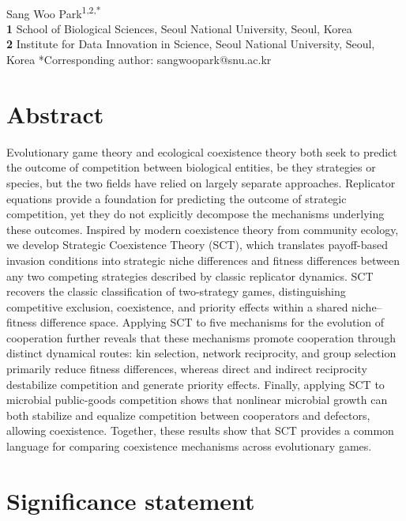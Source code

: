 \documentclass[12pt]{article}
\date{\today}
\begin{document}
\begin{flushleft}{
	\Large
	\textbf{}
}
\newline
\\
Sang Woo Park\textsuperscript{1,2,*}
\\
\bigskip
\textbf{1} School of Biological Sciences, Seoul National University, Seoul, Korea\\
\textbf{2} Institute for Data Innovation in Science, Seoul National University, Seoul, Korea
*Corresponding author: sangwoopark@snu.ac.kr
\end{flushleft}

\section*{Abstract}

Evolutionary game theory and ecological coexistence theory both seek to predict the outcome of competition between biological entities, be they strategies or species, but the two fields have relied on largely separate approaches.
Replicator equations provide a foundation for predicting the outcome of strategic competition, yet they do not explicitly decompose the mechanisms underlying these outcomes.
Inspired by modern coexistence theory from community ecology, we develop Strategic Coexistence Theory (SCT), which translates payoff-based invasion conditions into strategic niche differences and fitness differences between any two competing strategies described by classic replicator dynamics.
SCT recovers the classic classification of two-strategy games, distinguishing competitive exclusion, coexistence, and priority effects within a shared niche–fitness difference space.
Applying SCT to five mechanisms for the evolution of cooperation further reveals that these mechanisms promote cooperation through distinct dynamical routes: kin selection, network reciprocity, and group selection primarily reduce fitness differences, whereas direct and indirect reciprocity destabilize competition and generate priority effects.
Finally, applying SCT to microbial public-goods competition shows that nonlinear microbial growth can both stabilize and equalize competition between cooperators and defectors, allowing coexistence.
Together, these results show that SCT provides a common language for comparing coexistence mechanisms across evolutionary games.

\section*{Significance statement}
\end{document}
